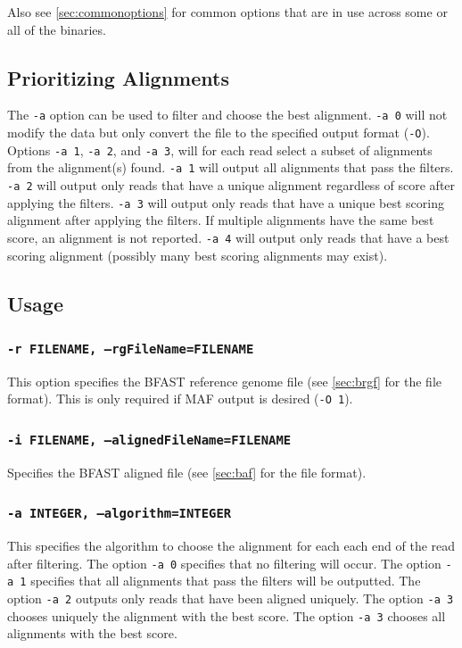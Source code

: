 \documentclass[a4paper,12pt]{book}
\newcommand{\TT}[1]{{\tt #1}} %
\newcommand{\BRGF}{BFAST reference genome file} %
\newcommand{\BAF}{BFAST aligned file} %
\begin{document}
Also see \autoref{sec:commonoptions} for common options that are in use across some or all of the binaries.

\subsection{Prioritizing Alignments}
\label{sec:prioritizing-alignments}

The \TT{-a} option can be used to filter and choose the best alignment.
\TT{-a 0} will not modify the data but only convert the file to the specified output format (\TT{-O}).
Options \TT{-a 1}, \TT{-a 2}, and \TT{-a 3}, will for each read select a subset of alignments from the alignment(s) found.
\TT{-a 1} will output all alignments that pass the filters.
\TT{-a 2} will output only reads that have a unique alignment regardless of score after applying the filters.
\TT{-a 3} will output only reads that have a unique best scoring alignment after applying the filters.
If multiple alignments have the same best score, an alignment is not reported.
\TT{-a 4} will output only reads that have a best scoring alignment (possibly many best scoring alignments may exist).

\subsection{Usage}

\subsubsection{\TT{-r FILENAME, --rgFileName=FILENAME}}
This option specifies the \BRGF{} (see \autoref{sec:brgf} for the file format).
This is only required if MAF output is desired (\TT{-O 1}).

\subsubsection{\TT{-i FILENAME, --alignedFileName=FILENAME}}
Specifies the \BAF{} (see \autoref{sec:baf} for the file format).

\subsubsection{\TT{-a INTEGER, --algorithm=INTEGER}}
This specifies the algorithm to choose the alignment for each each end of the read after filtering.
The option \TT{-a 0} specifies that no filtering will occur.
The option \TT{-a 1} specifies that all alignments that pass the filters will be outputted.
The option \TT{-a 2} outputs only reads that have been aligned uniquely.
The option \TT{-a 3} chooses uniquely the alignment with the best score.
The option \TT{-a 3} chooses all alignments with the best score.
\end{document}
